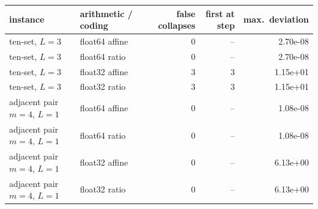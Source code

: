 \begin{tabular}{llrrr}
\toprule
instance & arithmetic / coding & false collapses & first at step & max.\ deviation\\
\midrule
ten-set, $L=3$ & float64 affine & 0 & -- & 2.70e-08\\
ten-set, $L=3$ & float64 ratio & 0 & -- & 2.70e-08\\
ten-set, $L=3$ & float32 affine & 3 & 3 & 1.15e+01\\
ten-set, $L=3$ & float32 ratio & 3 & 3 & 1.15e+01\\
adjacent pair $m=4$, $L=1$ & float64 affine & 0 & -- & 1.08e-08\\
adjacent pair $m=4$, $L=1$ & float64 ratio & 0 & -- & 1.08e-08\\
adjacent pair $m=4$, $L=1$ & float32 affine & 0 & -- & 6.13e+00\\
adjacent pair $m=4$, $L=1$ & float32 ratio & 0 & -- & 6.13e+00\\
\bottomrule
\end{tabular}

